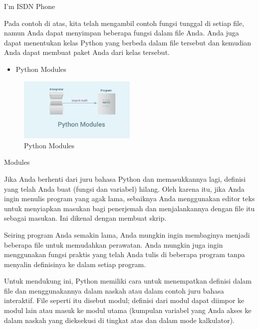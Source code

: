 \noindent \hspace*{0.5in}I'm ISDN Phone\par


\vspace{\baselineskip}
\noindent Pada contoh di atas, kita telah mengambil contoh fungsi tunggal di setiap file, namun Anda dapat menyimpan beberapa fungsi dalam file Anda. Anda juga dapat menentukan kelas Python yang berbeda dalam file tersebut dan kemudian Anda dapat membuat paket Anda dari kelas tersebut.\par

\vspace{\baselineskip}


\begin{itemize}
	\item Python Modules
\end{itemize}

\begin{figure}[ht]
	\centerline{\includegraphics[width=0.50\textwidth]{figures/python_modules}}
	\caption{Python Modules}
	\label{Python Modules}
\end{figure}
\vspace{\baselineskip}

\noindent Modules\par

\vspace{\baselineskip}
\noindent Jika Anda berhenti dari juru bahasa Python dan memasukkannya lagi, definisi yang telah Anda buat (fungsi dan variabel) hilang. Oleh karena itu, jika Anda ingin menulis program yang agak lama, sebaiknya Anda menggunakan editor teks untuk menyiapkan masukan bagi penerjemah dan menjalankannya dengan file itu sebagai masukan. Ini dikenal dengan membuat skrip.\par
\vspace{\baselineskip}
\noindent Seiring program Anda semakin lama, Anda mungkin ingin membaginya menjadi beberapa file untuk memudahkan perawatan. Anda mungkin juga ingin menggunakan fungsi praktis yang telah Anda tulis di beberapa program tanpa menyalin definisinya ke dalam setiap program.\par
\vspace{\baselineskip}
\noindent Untuk mendukung ini, Python memiliki cara untuk menempatkan definisi dalam file dan menggunakannya dalam naskah atau dalam contoh juru bahasa interaktif. File seperti itu disebut modul; definisi dari modul dapat diimpor ke modul lain atau masuk ke modul utama (kumpulan variabel yang Anda akses ke dalam naskah yang dieksekusi di tingkat atas dan dalam mode kalkulator).\par

